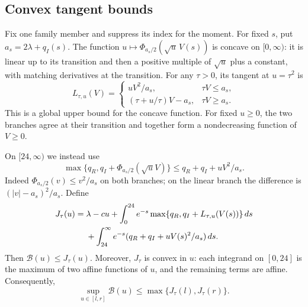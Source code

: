 \documentclass[11pt]{article}
\theoremstyle{remark}\newtheorem{remark}[theorem]{Remark}
\begin{document}
\subsection{Convex tangent bounds}

Fix one family member and suppress its index for the moment. For fixed
\(s\), put \(a_s=2\lambda+q_I(s)\). The function
\(u\mapsto\Phi_{a_s/2}(\sqrt u\,V(s))\) is concave on
\([0,\infty)\): it is linear up to its transition and then a
positive multiple of \(\sqrt u\) plus a constant, with matching
derivatives at the transition. For any \(\tau>0\), its tangent at
\(u=\tau^2\) is
\begin{equation}\label{eq:tangent}
L_{\tau,u}(V)=
\begin{cases}
uV^2/a_s,&\tau V\le a_s,\\
(\tau+u/\tau)V-a_s,&\tau V\ge a_s.
\end{cases}
\end{equation}
This is a global upper bound for the concave function. For fixed
\(u\ge0\), the two branches agree at their transition and together
form a nondecreasing function of \(V\ge0\).

On \([24,\infty)\) we instead use
\begin{equation}\label{eq:tailbound}
\max\{q_R,q_I+\Phi_{a_s/2}(\sqrt u V)\}
\le q_R+q_I+uV^2/a_s.
\end{equation}
Indeed \(\Phi_{a_s/2}(v)\le v^2/a_s\) on both branches; on the
linear branch the difference is \((|v|-a_s)^2/a_s\).
Define
\begin{align}
J_\tau(u)={}&\lambda-cu+
\int_0^{24}e^{-s}\max\{q_R,q_I+L_{\tau,u}(V(s))\}\,ds\notag\\
&+\int_{24}^\infty e^{-s}(q_R+q_I+uV(s)^2/a_s)\,ds.
\label{eq:J}
\end{align}
Then \(\mathcal B(u)\le J_\tau(u)\). Moreover, \(J_\tau\) is
convex in \(u\): each integrand on \([0,24]\) is the maximum of
two affine functions of \(u\), and the remaining terms are affine.
Consequently,
\begin{equation}\label{eq:convex_cover}
\sup_{u\in[l,r]}\mathcal B(u)
\le\max\{J_\tau(l),J_\tau(r)\}.
\end{equation}
\end{document}
